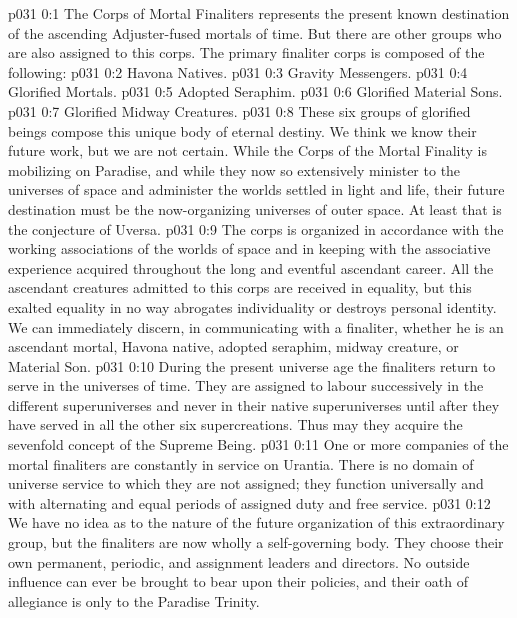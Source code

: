 \author{Divine Counsellor and One Without Name and Number}
\vs p031 0:1 The Corps of Mortal Finaliters represents the present known destination of the ascending Adjuster\hyp{}fused mortals of time. But there are other groups who are also assigned to this corps. The primary finaliter corps is composed of the following:
\vs p031 0:2 \bibnobreakspace Havona Natives.
\vs p031 0:3 \bibnobreakspace Gravity Messengers.
\vs p031 0:4 \bibnobreakspace Glorified Mortals.
\vs p031 0:5 \bibnobreakspace Adopted Seraphim.
\vs p031 0:6 \bibnobreakspace Glorified Material Sons.
\vs p031 0:7 \bibnobreakspace Glorified Midway Creatures.
\vs p031 0:8 \pc These six groups of glorified beings compose this unique body of eternal destiny. We think we know their future work, but we are not certain. While the Corps of the Mortal Finality is mobilizing on Paradise, and while they now so extensively minister to the universes of space and administer the worlds settled in light and life, their future destination must be the now\hyp{}organizing universes of outer space. At least that is the conjecture of Uversa.
\vs p031 0:9 The corps is organized in accordance with the working associations of the worlds of space and in keeping with the associative experience acquired throughout the long and eventful ascendant career. All the ascendant creatures admitted to this corps are received in equality, but this exalted equality in no way abrogates individuality or destroys personal identity. We can immediately discern, in communicating with a finaliter, whether he is an ascendant mortal, Havona native, adopted seraphim, midway creature, or Material Son.
\vs p031 0:10 During the present universe age the finaliters return to serve in the universes of time. They are assigned to labour successively in the different superuniverses and never in their native superuniverses until after they have served in all the other six supercreations. Thus may they acquire the sevenfold concept of the Supreme Being.
\vs p031 0:11 One or more companies of the mortal finaliters are constantly in service on Urantia. There is no domain of universe service to which they are not assigned; they function universally and with alternating and equal periods of assigned duty and free service.
\vs p031 0:12 We have no idea as to the nature of the future organization of this extraordinary group, but the finaliters are now wholly a self\hyp{}governing body. They choose their own permanent, periodic, and assignment leaders and directors. No outside influence can ever be brought to bear upon their policies, and their oath of allegiance is only to the Paradise Trinity.
